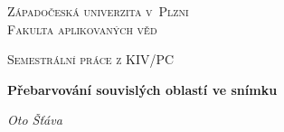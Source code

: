 \begin{titlepage}
    \centering
    {\scshape\LARGE Západočeská univerzita v~Plzni\\ Fakulta aplikovaných věd \par}
    \vspace{1cm}
    {\scshape\Large Semestrální práce z KIV/PC\par}
    \vspace{1.5cm}
    {\huge\bfseries Přebarvování souvislých oblastí ve snímku\par}
    \vspace{2cm}
    {\Large\itshape Oto Šťáva\par}
\end{titlepage}
